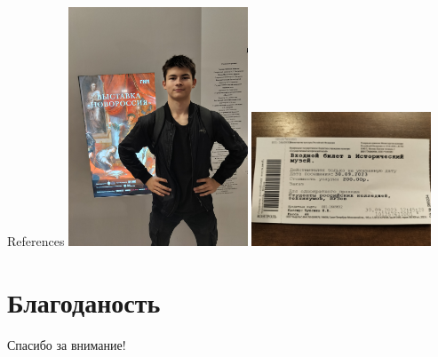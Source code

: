 \begin{frame}[t]{References}
	\printbibliography
	\includegraphics[width=0.4\textwidth]{self.jpg}
	\includegraphics[width=0.4\textwidth]{ticket.jpg}
	\url{}
	\url{}
\end{frame}

\section{Благоданость}
\begin{frame}
	\centering
	\huge
	Спасибо за внимание!
\end{frame}



